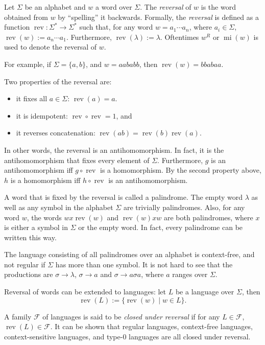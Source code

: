 \documentclass[12pt]{article}
\begin{document}
Let $\Sigma$ be an alphabet and $w$ a word over $\Sigma$.  The \emph{reversal} of $w$ is the word obtained from $w$ by ``spelling'' it backwards.  Formally, the \emph{reversal} is defined as a function $\operatorname{rev}:\Sigma^* \to \Sigma^*$ such that, for any word $w=a_1\cdots a_n$, where $a_i \in \Sigma$, $\operatorname{rev}(w):= a_n \cdots a_1$.  Furthermore, $\operatorname{rev}(\lambda):=\lambda$.  Oftentimes $w^R$ or $\operatorname{mi}(w)$ is used to denote the reversal of $w$.

For example, if $\Sigma = \lbrace a, b\rbrace$, and $w=aababb$, then $\operatorname{rev}(w)=bbabaa$.

Two properties of the reversal are:
\begin{itemize}
\item it fixes all $a\in \Sigma$: $\operatorname{rev}(a)=a$.
\item it is idempotent: $\operatorname{rev}\circ \operatorname{rev} = 1$, and 
\item it reverses concatenation: $\operatorname{rev}(ab)=\operatorname{rev}(b)\operatorname{rev}(a)$.
\end{itemize}
In other words, the reversal is an antihomomorphism.  In fact, it is the antihomomorphism that fixes every element of $\Sigma$.  Furthermore, $g$ is an antihomomorphism iff $g\circ \operatorname{rev}$ is a homomorphism.  By the second property above, $h$ is a homomorphism iff $h\circ \operatorname{rev}$ is an antihomomorphism.

A word that is fixed by the reversal is called a palindrome.  The empty word $\lambda$ as well as any symbol in the alphabet $\Sigma$ are trivially palindromes.  Also, for any word $w$, the words $wx\operatorname{rev}(w)$ and $\operatorname{rev}(w)xw$ are both palindromes, where $x$ is either a symbol in $\Sigma$ or the empty word.  In fact, every palindrome can be written this way.

The language consisting of all palindromes over an alphabet is context-free, and not regular if $\Sigma$ has more than one symbol.  It is not hard to see that the productions are $\sigma \to \lambda$, $\sigma \to a$ and $\sigma \to a\sigma a$, where $a$ ranges over $\Sigma$.

Reversal of words can be extended to languages: let $L$ be a language over $\Sigma$, then $$\operatorname{rev}(L):= \lbrace \operatorname{rev}(w) \mid w\in L\rbrace.$$

A family $\mathscr{F}$ of languages is said to be \emph{closed under reversal} if for any $L\in \mathscr{F}$, $\operatorname{rev}(L)\in \mathscr{F}$.  It can be shown that regular languages, context-free languages, context-sensitive languages, and type-0 languages are all closed under reversal.
\end{document}
